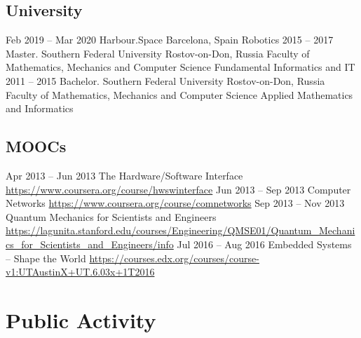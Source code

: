 \documentclass[11pt,a4paper]{moderncv}
\newcommand{\EngRus}[2]{#1}
\newcommand{\BirthPlaceOfValour}{\EngRus{Rostov-on-Don, Russia}{Ростов-на-Дону, Россия}}
\newcommand{\SunshinePalace}{\EngRus{Barcelona, Spain}{Барселона, Испания}}
\begin{document}
  \subsection{\EngRus{University}{Университет}}
    \cventry
      {\EngRus{Feb}{Фев} 2019 -- \EngRus{Mar}{Мар} 2020}
      {\EngRus{Harbour.Space}{Harbour.Space}}
      {\SunshinePalace}
      {}
      {\EngRus{Robotics}{Робототехника}}
      {}
    \cventry
      {2015 -- 2017}
      {\EngRus{Master. Southern Federal University}{Магистратура. Южный Федеральный Университет}}
      {\BirthPlaceOfValour}
      {\EngRus{Faculty of Mathematics, Mechanics and Computer Science}
      {Институт математики, механики и компьютерных наук им. И.И. Воровича}}
      {\EngRus{Fundamental Informatics and IT}{Фундаментальная информатика и информационные технологии}}
      {}
    \cventry
      {2011 -- 2015}
      {\EngRus{Bachelor. Southern Federal University}{Бакалавриат. Южный Федеральный Университет}}
      {\BirthPlaceOfValour}
      {\EngRus{Faculty of Mathematics, Mechanics and Computer Science}
      {Институт математики, механики и компьютерных наук им. И.И. Воровича}}
      {\EngRus{Applied Mathematics and Informatics}{Прикладная математика и информатика}}
      {}
  \subsection{\EngRus{MOOCs}{Онлайн курсы}}
    \cventry
      {\EngRus{Apr}{Апр} 2013 -- \EngRus{Jun}{Июн} 2013}
      {The Hardware/Software Interface}
      {\newline\url{https://www.coursera.org/course/hwswinterface}}
      {}{}{}
    \cventry
      {\EngRus{Jun}{Июн} 2013 -- \EngRus{Sep}{Сен} 2013}
      {Computer Networks}
      {\newline\url{https://www.coursera.org/course/comnetworks}}
      {}{}{}
    \cventry
      {\EngRus{Sep}{Сентябрь} 2013 -- \EngRus{Nov}{Ноябрь} 2013}
      {Quantum Mechanics for Scientists and Engineers}
      {\newline\url{https://lagunita.stanford.edu/courses/Engineering/QMSE01/Quantum_Mechanics_for_Scientists_and_Engineers/info}}
      {}{}{}
    \cventry
      {\EngRus{Jul}{Июл} 2016 -- \EngRus{Aug}{Авг} 2016}
      {Embedded Systems -- Shape the World}
      {\newline\url{https://courses.edx.org/courses/course-v1:UTAustinX+UT.6.03x+1T2016}}
      {}{}{}

\section{\EngRus{Public Activity}{Публичная деятельность}}
\end{document}
